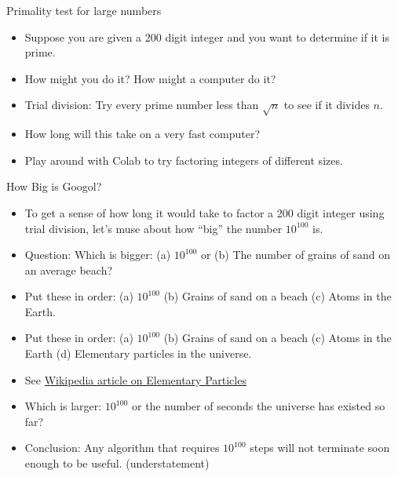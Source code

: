 \documentclass{beamer}
\begin{document}
\begin{frame}{Primality test for large numbers}
\begin{itemize}
  \item Suppose you are given a 200 digit integer  and you want to determine if it is prime.
  \item How might you do it? How might a computer do it?
  \item Trial division: Try every prime number less than $\sqrt{n}$ to see if it divides $n$.
  \item How long will this take on a very fast computer?
  \item Play around with Colab to try factoring integers of different sizes.
\end{itemize}
\end{frame}

\begin{frame}{How Big is Googol?}
\begin{itemize}
  \item To get a sense of how long it would take to factor a 200 digit integer using trial division,
  let's muse about how ``big'' the number $10^{100}$ is.
  \item Question: Which is bigger: (a) $10^{100}$ or (b) The number of grains of sand on an average beach?
  \item Put these in order: (a) $10^{100}$ (b) Grains of sand on a beach
  (c) Atoms in the Earth.
  \item Put these in order: (a) $10^{100}$ (b) Grains of sand on a beach
  (c) Atoms in the Earth (d) Elementary particles in the universe.
  \item See \href{https://en.wikipedia.org/wiki/Elementary_particle\#Cosmic_abundance_of_elementary_particles}{Wikipedia article on Elementary Particles}
  \item Which is larger: $10^{100}$ or the number of seconds the universe has existed so far?
  \item Conclusion: Any algorithm that requires $10^{100}$ steps will not terminate soon enough to be useful. (understatement)
\end{itemize}
\end{frame}
\end{document}
